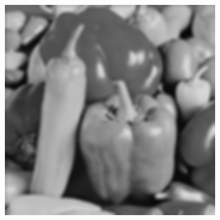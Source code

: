\begin{figure}[htbp]
\begin{subfigure}[b]{0.2\textwidth}
    \vspace*{0.02\textwidth}
  \end{subfigure}%
  \hspace*{0.02\textwidth}
  \begin{subfigure}[b]{0.2\textwidth}
    \centering
    \includegraphics[width=\textwidth]{figs/method/fourier/peppers_blur_original.png}
    \vspace*{0.02\textwidth}
  \end{subfigure}


\end{figure}
